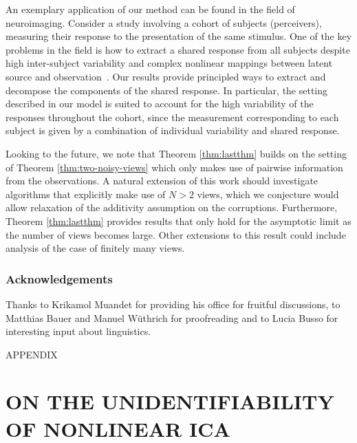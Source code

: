 \documentclass[letterpaper]{article}
\theoremstyle{definition}
\begin{document}
An exemplary application of our method can be found in the field of neuroimaging.
Consider a study involving a cohort of subjects (perceivers), measuring their response to the presentation of the same stimulus.
One of the key problems in the field is how to extract a shared response from all subjects despite high inter-subject variability and complex nonlinear mappings between latent source and observation~\cite{chen2015reduced, haxby2011common}.
Our results provide principled ways to extract and decompose the components of the shared response.
In particular, the setting described in our model is suited to account for the high variability of the responses throughout the cohort, since the measurement corresponding to each subject is given by a combination of individual variability and shared response.

Looking to the future, we note that Theorem \ref{thm:lastthm} builds on the setting of Theorem \ref{thm:two-noisy-views} which only makes use of pairwise information from the observations.
A natural extension of this work should investigate algorithms that explicitly make use of $N>2$ views, which we conjecture would allow relaxation of the additivity assumption on the corruptions.
Furthermore, Theorem \ref{thm:lastthm} provides results that only hold for the asymptotic limit as the number of views becomes large.
Other extensions to this result could include analysis of the case of finitely many views.








\subsubsection*{Acknowledgements}

Thanks to Krikamol Muandet for providing his office for fruitful discussions, to Matthias Bauer and Manuel W\"uthrich for proofreading and to Lucia Busso for interesting input about linguistics.





\clearpage




\clearpage
\appendix
\begin{center}
{\centering \LARGE APPENDIX}
\vspace{1cm}
\sloppy

\end{center}

\section{ON THE UNIDENTIFIABILITY OF NONLINEAR ICA}
\label{sec:on_unident}
\end{document}
